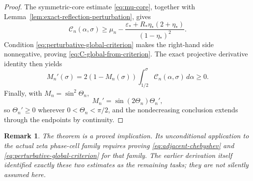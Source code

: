 \documentclass[11pt]{amsart}
\numberwithin{equation}{section}
\newtheorem{remark}[theorem]{Remark}
\begin{document}
\begin{proof}
The symmetric-core estimate \eqref{eq:mu-core}, together with Lemma~\ref{lem:exact-reflection-perturbation}, gives
\[
\mathcal C_n(\alpha,\sigma)
\ge\mu_n-\frac{\varepsilon_*+R_*\eta_*(2+\eta_*)}{(1-\eta_*)^2}.
\]
Condition \eqref{eq:perturbative-global-criterion} makes the right-hand side nonnegative, proving \eqref{eq:C-global-from-criterion}. The exact projective derivative identity then yields
\[
M_n'(\sigma)=2(1-M_n(\sigma))\int_{1/2}^{\sigma}\mathcal C_n(\alpha,\sigma)\,d\alpha\ge0.
\]
Finally, with $M_n=\sin^2\Theta_n$,
\[
M_n'=\sin(2\Theta_n)\Theta_n',
\]
so $\Theta_n'\ge0$ wherever $0<\Theta_n<\pi/2$, and the nondecreasing conclusion extends through the endpoints by continuity.
\end{proof}

\begin{remark}
The theorem is a proved implication. Its unconditional application to the actual zeta phase-cell family requires proving \eqref{eq:adjacent-chebyshev} and \eqref{eq:perturbative-global-criterion} for that family. The earlier derivation itself identified exactly these two estimates as the remaining tasks; they are not silently assumed here.
\end{remark}
\end{document}

